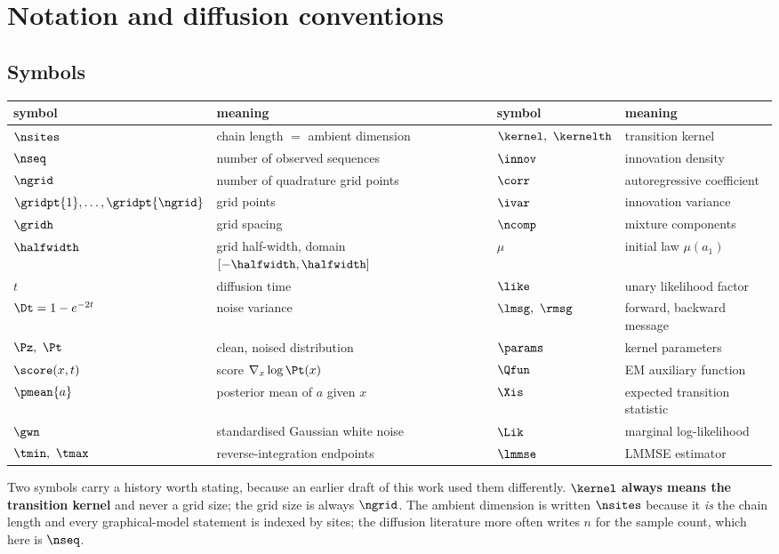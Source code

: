 \section{Notation and diffusion conventions}
\label{app:notation}

\subsection{Symbols}

\begin{center}
\small
\begin{tabular}{ll@{\qquad}ll}
\toprule
symbol & meaning & symbol & meaning \\
\midrule
$\nsites$ & chain length $=$ ambient dimension & $\kernel,\ \kernelth$ & transition kernel \\
$\nseq$ & number of observed sequences & $\innov$ & innovation density \\
$\ngrid$ & number of quadrature grid points & $\corr$ & autoregressive coefficient \\
$\gridpt{1},\dots,\gridpt{\ngrid}$ & grid points & $\ivar$ & innovation variance \\
$\gridh$ & grid spacing & $\ncomp$ & mixture components \\
$\halfwidth$ & grid half-width, domain $[-\halfwidth,\halfwidth]$ & $\mu$ & initial law $\mu(a_1)$ \\
$t$ & diffusion time & $\like$ & unary likelihood factor \\
$\Dt = 1-e^{-2t}$ & noise variance & $\lmsg,\ \rmsg$ & forward, backward message \\
$\Pz,\ \Pt$ & clean, noised distribution & $\params$ & kernel parameters \\
$\score(x,t)$ & score $\nabla_x\log\Pt(x)$ & $\Qfun$ & EM auxiliary function \\
$\pmean{a}$ & posterior mean of $a$ given $x$ & $\Xis$ & expected transition statistic \\
$\gwn$ & standardised Gaussian white noise & $\Lik$ & marginal log-likelihood \\
$\tmin,\ \tmax$ & reverse-integration endpoints & $\lmmse$ & LMMSE estimator \\
\bottomrule
\end{tabular}
\end{center}

Two symbols carry a history worth stating, because an earlier draft of this work used them
differently. \textbf{$\kernel$ always means the transition kernel} and never a grid size; the
grid size is always $\ngrid$. The ambient dimension is written $\nsites$ because it \emph{is} the
chain length and every graphical-model statement is indexed by sites; the diffusion literature
more often writes $n$ for the sample count, which here is $\nseq$.

